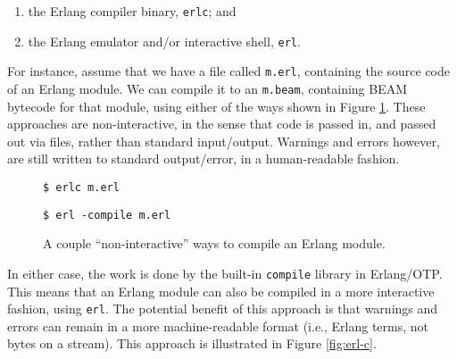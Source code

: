 \begin{enumerate}

\item the Erlang compiler binary, \texttt{erlc}; and

\item the Erlang emulator and/or interactive shell, \texttt{erl}.

\end{enumerate}

For instance, assume that we have a file called \texttt{m.erl},
containing the source code of an Erlang module. We can compile it to
an \texttt{m.beam}, containing BEAM bytecode for that module, using
either of the ways shown in Figure \ref{fig:erlc}. These approaches
are non-interactive, in the sense that code is passed in, and passed
out via files, rather than standard input/output. Warnings and errors
however, are still written to standard output/error, in a
human-readable fashion.

\begin{figure}[h!]
\begin{minipage}[t]{0.5\textwidth}
\begin{lstlisting}
$ erlc m.erl
\end{lstlisting}
\end{minipage}%
\begin{minipage}[t]{0.5\textwidth}
\begin{lstlisting}
$ erl -compile m.erl
\end{lstlisting}
\end{minipage}%
\caption{A couple ``non-interactive'' ways to compile an Erlang
module.}
\label{fig:erlc}
\end{figure}

In either case, the work is done by the built-in \texttt{compile}
library in Erlang/OTP. This means that an Erlang module can also be
compiled in a more interactive fashion, using \texttt{erl}. The
potential benefit of this approach is that warnings and errors can
remain in a more machine-readable format (i.e., Erlang terms, not
bytes on a stream). This approach is illustrated in Figure
\ref{fig:erl-c}.

